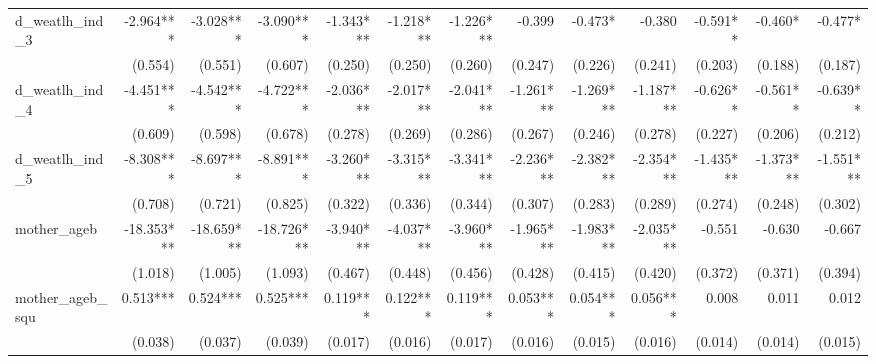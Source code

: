 \begin{tabular}{lrrrrrrrrrrrr}
d\_weatlh\_ind\_3                           &    -2.964*** &    -3.028*** &    -3.090*** &    -1.343*** &    -1.218*** &    -1.226*** &       -0.399 &      -0.473* &       -0.380 &     -0.591** &      -0.460* &      -0.477* \\ 
                                            &      (0.554) &      (0.551) &      (0.607) &      (0.250) &      (0.250) &      (0.260) &      (0.247) &      (0.226) &      (0.241) &      (0.203) &      (0.188) &      (0.187) \\ 
d\_weatlh\_ind\_4                           &    -4.451*** &    -4.542*** &    -4.722*** &    -2.036*** &    -2.017*** &    -2.041*** &    -1.261*** &    -1.269*** &    -1.187*** &     -0.626** &     -0.561** &     -0.639** \\ 
                                            &      (0.609) &      (0.598) &      (0.678) &      (0.278) &      (0.269) &      (0.286) &      (0.267) &      (0.246) &      (0.278) &      (0.227) &      (0.206) &      (0.212) \\ 
d\_weatlh\_ind\_5                           &    -8.308*** &    -8.697*** &    -8.891*** &    -3.260*** &    -3.315*** &    -3.341*** &    -2.236*** &    -2.382*** &    -2.354*** &    -1.435*** &    -1.373*** &    -1.551*** \\ 
                                            &      (0.708) &      (0.721) &      (0.825) &      (0.322) &      (0.336) &      (0.344) &      (0.307) &      (0.283) &      (0.289) &      (0.274) &      (0.248) &      (0.302) \\ 
mother\_ageb                                &   -18.353*** &   -18.659*** &   -18.726*** &    -3.940*** &    -4.037*** &    -3.960*** &    -1.965*** &    -1.983*** &    -2.035*** &       -0.551 &       -0.630 &       -0.667 \\ 
                                            &      (1.018) &      (1.005) &      (1.093) &      (0.467) &      (0.448) &      (0.456) &      (0.428) &      (0.415) &      (0.420) &      (0.372) &      (0.371) &      (0.394) \\ 
mother\_ageb\_squ                           &     0.513*** &     0.524*** &     0.525*** &     0.119*** &     0.122*** &     0.119*** &     0.053*** &     0.054*** &     0.056*** &        0.008 &        0.011 &        0.012 \\ 
                                            &      (0.038) &      (0.037) &      (0.039) &      (0.017) &      (0.016) &      (0.017) &      (0.016) &      (0.015) &      (0.016) &      (0.014) &      (0.014) &      (0.015) \\ 

\end{tabular}
